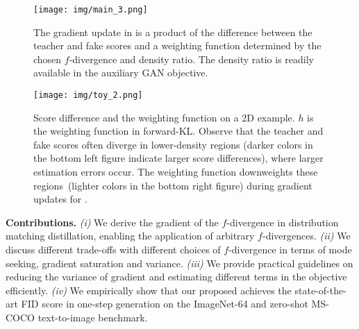 \begin{figure*}[t]
    \centering
    \vspace{-0.8cm}
    \texttt{[image: img/main\_3.png]}
    \vspace{-8pt}
    \caption{The gradient update in \methodtext is a product of the difference between the teacher and fake scores and a weighting function determined by the chosen $f$-divergence and density ratio. The density ratio is readily available in the auxiliary GAN objective. %
    }
    \label{fig:teaser}
    \vspace{-10pt}
\end{figure*}


 \begin{figure}
     \centering
     \texttt{[image: img/toy\_2.png]}
     \caption{Score difference and the weighting function on a 2D example. $h$ is the weighting function in forward-KL.  Observe that the teacher and fake scores often diverge in lower-density regions (darker colors in the bottom left figure indicate larger score differences), where larger estimation errors occur. The weighting function downweights these regions~(lighter colors in the bottom right figure) during gradient updates for \method.}
     \label{fig:toy_diff}
     \vspace{-12pt}
 \end{figure}



\textbf{Contributions.} \textit{(i)} We derive the gradient of the $f$-divergence in distribution matching distillation, enabling the application of arbitrary $f$-divergences. \textit{(ii)} We discuss different trade-offs with different choices of $f$-divergence in terms of mode seeking, gradient saturation and variance. \textit{(iii)} We provide practical guidelines on reducing the variance of gradient and estimating different terms in the objective efficiently. \textit{(iv)} We empirically show that our proposed \methodtext achieves the state-of-the-art FID score in one-step generation on the ImageNet-64 and zero-shot MS-COCO text-to-image benchmark. 

